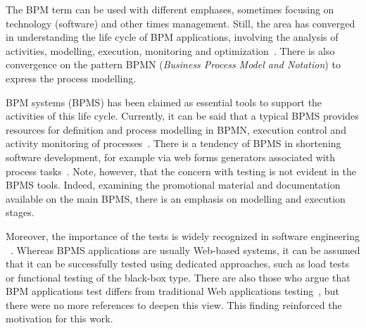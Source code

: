 \documentclass[runningheads,a4paper]{llncs}
\begin{document}
The BPM term can be used with different emphases, sometimes focusing on technology (software) and other times management. Still, the area has converged in understanding the life cycle of BPM applications, involving the analysis of activities, modelling, execution, monitoring and optimization~\cite{ABPMP}. There is also convergence on the pattern BPMN (\emph{Business Process Model and Notation}) to express the process modelling. 


BPM systems (BPMS) has been claimed as essential tools to support the activities of this life cycle. Currently, it can be said that a typical BPMS provides resources for definition and process modelling in BPMN, execution control and activity monitoring of processes~\cite{forrester}. There is a tendency of BPMS in shortening software development, for example via web forms generators associated with process tasks~\cite{greenresearch}. Note, however, that the concern with testing is not evident in the BPMS tools. Indeed, examining the promotional material and documentation available on the main BPMS, there is an emphasis on modelling and execution stages.


Moreover, the importance of the tests is widely recognized in software engineering ~\cite{swebok14}. 
Whereas BPMS applications are usually Web-based systems, it can be assumed that it can be successfully tested using dedicated approaches, such as load tests or functional testing of the black-box type. There are also those who argue that BPM applications test differs from traditional Web applications testing~\cite{evoke}, but there were no more references to deepen this view. This finding reinforced the motivation for this work. 
\end{document}
